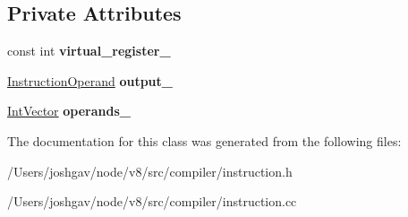 \subsection*{Private Attributes}
\begin{DoxyCompactItemize}
\item 
const int {\bfseries virtual\+\_\+register\+\_\+}\hypertarget{classv8_1_1internal_1_1compiler_1_1_phi_instruction_a73b57c1c3e19c43e5fe210faa02c3407}{}\label{classv8_1_1internal_1_1compiler_1_1_phi_instruction_a73b57c1c3e19c43e5fe210faa02c3407}

\item 
\hyperlink{classv8_1_1internal_1_1compiler_1_1_instruction_operand}{Instruction\+Operand} {\bfseries output\+\_\+}\hypertarget{classv8_1_1internal_1_1compiler_1_1_phi_instruction_aa657a45961a12867d0415f63e55bcb78}{}\label{classv8_1_1internal_1_1compiler_1_1_phi_instruction_aa657a45961a12867d0415f63e55bcb78}

\item 
\hyperlink{classv8_1_1internal_1_1_zone_vector}{Int\+Vector} {\bfseries operands\+\_\+}\hypertarget{classv8_1_1internal_1_1compiler_1_1_phi_instruction_a97aeb3e588ae5e0b3e60667df12124ec}{}\label{classv8_1_1internal_1_1compiler_1_1_phi_instruction_a97aeb3e588ae5e0b3e60667df12124ec}

\end{DoxyCompactItemize}


The documentation for this class was generated from the following files\+:\begin{DoxyCompactItemize}
\item 
/\+Users/joshgav/node/v8/src/compiler/instruction.\+h\item 
/\+Users/joshgav/node/v8/src/compiler/instruction.\+cc\end{DoxyCompactItemize}
